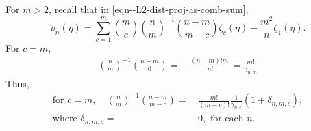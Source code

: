 \documentclass[12pt]{article}
\numberwithin{equation}{section}
\theoremstyle{definition}
\theoremstyle{plain}
\begin{document}
For \(m > 2\), recall that in \eqref{eqn--L2-dist-proj-as-comb-sum},
\begin{equation*}
  \rho_{n} (\eta) = \sum_{c = 1}^{m} \binom{m}{c} \binom{n}{m}^{- 1} \binom{n
  - m}{m - c} \zeta_{c} (\eta) - \frac{m^{2}}{n} \zeta_{1} (\eta).
\end{equation*}
For \(c = m\),
\begin{align*}
  \binom{n}{m}^{- 1} \binom{n - m}{0} =
  & \,
  \frac{(n - m)! m!}{n!} = \frac{m!}{\gamma_{n, m}}
\end{align*}
Thus,
\begin{equation*}
  \begin{split}
    \text{for } c = m, \quad
    \binom{n}{m}^{- 1} \binom{n - m}{m - c} =
    & \, \frac{m!}{(m - c)!} \frac{1}{\gamma_{n, c}} \left( 1 + \delta_{n, m, c}
    \right), \\
    \text{where } \delta_{n, m, c} = & \, 0, \text{ for each } n.
  \end{split}
\end{equation*}
\end{document}
